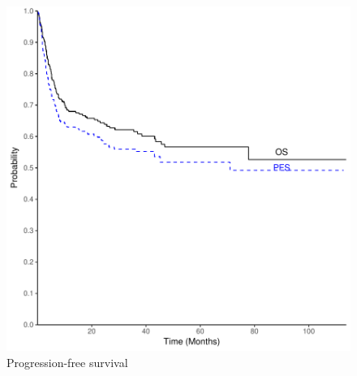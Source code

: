 \documentclass[a4paper,11pt] {article}
\begin{document}
\begin{figure}[h]
\begin{center}
\includegraphics{Rapport-fig3}
\end{center}
\caption{Progression-free survival}
\label{fig3}
\end{figure}
\end{document}
